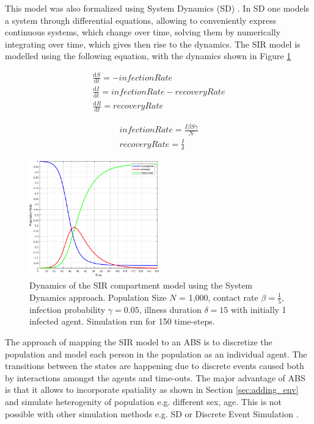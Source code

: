 This model was also formalized using System Dynamics (SD) \cite{porter_industrial_1962}. In SD one models a system through differential equations, allowing to conveniently express continuous systems, which change over time, solving them by numerically integrating over time, which gives then rise to the dynamics. The SIR model is modelled using the following equation, with the dynamics shown in Figure \ref{fig:sir_sd_dynamics} 

\begin{equation}
\begin{aligned}
\frac{\mathrm d S}{\mathrm d t} = -infectionRate \\
\frac{\mathrm d I}{\mathrm d t} = infectionRate - recoveryRate \\
\frac{\mathrm d R}{\mathrm d t} = recoveryRate 
\end{aligned}
\end{equation}

\begin{equation}
\begin{aligned}
infectionRate = \frac{I \beta S \gamma}{N} \\
recoveryRate = \frac{I}{\delta} 
\end{aligned}
\end{equation}

\begin{figure}
	\centering
	\includegraphics[width=0.5\textwidth, angle=0]{./fig/fpabs/timedriven/SIR_SD_1000agents_150t_001dt.png}
	\caption{Dynamics of the SIR compartment model using the System Dynamics approach. Population Size $N$ = 1,000, contact rate $\beta =  \frac{1}{5}$, infection probability $\gamma = 0.05$, illness duration $\delta = 15$ with initially 1 infected agent. Simulation run for 150 time-steps.}
	\label{fig:sir_sd_dynamics}
\end{figure}

The approach of mapping the SIR model to an ABS is to discretize the population and model each person in the population as an individual agent. The transitions between the states are happening due to discrete events caused both by interactions amongst the agents and time-outs. The major advantage of ABS is that it allows to incorporate spatiality as shown in Section \ref{sec:adding_env} and simulate heterogenity of population e.g. different sex, age. This is not possible with other simulation methods e.g. SD or Discrete Event Simulation \cite{zeigler_theory_2000}.

